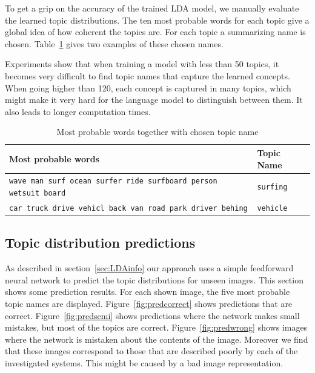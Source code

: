 \documentclass[twoside,twocolumn]{article}
\begin{document}
	To get a grip on the accuracy of the trained LDA model, we manually evaluate the learned topic distributions. The ten most probable words for each topic give a global idea of how coherent the topics are. For each topic a summarizing name is chosen. Table~\ref{tbl:woorden-naar-topic} gives two examples of these chosen names.
	
	Experiments show that when training a model with less than 50 topics, it becomes very difficult to find topic names that capture the learned concepts. When going higher than 120, each concept is captured in many topics, which might make it very hard for the language model to distinguish between them. It also leads to longer computation times. 
	
	\begin{table}[!t]
		\centering
		\begin{tabular}{ll}
			Most probable words                                               & Topic Name \\ \hline
			\texttt{\small{wave man surf ocean surfer ride surfboard person wetsuit board}} & \texttt{surfing}       \\
			\texttt{\small{car truck drive vehicl back van road park driver behing}}        & \texttt{vehicle}      \\
		\end{tabular}
		\caption{Most probable words together with chosen topic name}	\label{tbl:woorden-naar-topic}
	\end{table}
	
	\subsection{Topic distribution predictions}
	As described in section~\ref{sec:LDAinfo} our approach uses a simple feedforward neural network to predict the topic distributions for unseen images. This section shows some prediction results. For each shown image, the five most probable topic names are displayed. Figure~\ref{fig:predcorrect} shows predictions that are correct. Figure~\ref{fig:predsemi} shows predictions where the network makes small mistakes, but most of the topics are correct. Figure~\ref{fig:predwrong} shows images where the network is mistaken about the contents of the image. Moreover we find that these images correspond to those that are described poorly by each of the investigated systems. This might be caused by a bad image representation.
	
\end{document}
